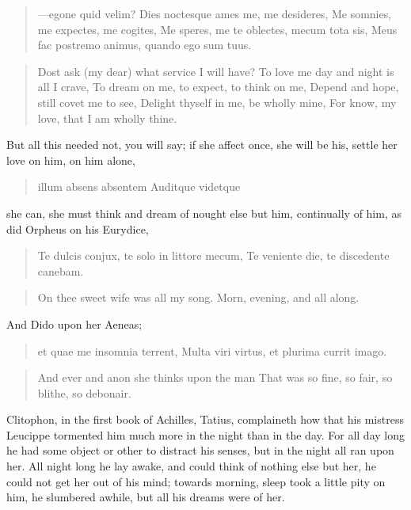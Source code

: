 \begin{latin}
\begin{verse}
---egone quid velim?
Dies noctesque ames me, me desideres,
Me somnies, me expectes, me cogites,
Me speres, me te oblectes, mecum tota sis,
Meus fac postremo animus, quando ego sum tuus.
\end{verse}
\end{latin}
\translationrule%
\begin{verse}%
Dost ask (my dear) what service I will have?
To love me day and night is all I crave,
To dream on me, to expect, to think on me,
Depend and hope, still covet me to see,
Delight thyself in me, be wholly mine,
For know, my love, that I am wholly thine.
\end{verse}%

But all this needed not, you will say; if she affect once, she will be
his, settle her love on him, on him alone,

\begin{latin}
\begin{verse}
illum absens absentem
Auditque videtque
\end{verse}
\end{latin}

she can, she must think and dream of nought else but him, continually
of him, as did Orpheus on his Eurydice,

\begin{latin}
\begin{verse}
Te dulcis conjux, te solo in littore mecum,
Te veniente die, te discedente canebam.
\end{verse}
\end{latin}
\translationrule%
\begin{verse}%
On thee sweet wife was all my song.
Morn, evening, and all along.
\end{verse}%

And Dido upon her Aeneas;

\begin{latin}
\begin{verse}
et quae me insomnia terrent,
Multa viri virtus, et plurima currit imago.
\end{verse}
\end{latin}
\translationrule%
\begin{verse}%
And ever and anon she thinks upon the man
That was so fine, so fair, so blithe, so debonair.
\end{verse}%

Clitophon, in the first book of Achilles, Tatius, complaineth how that
his mistress Leucippe tormented him much more in the night than in the
day. For all day long he had some object or other to distract his
senses, but in the night all ran upon her. All night long he lay 
awake, and could think of nothing else but her, he could not get her
out of his mind; towards morning, sleep took a little pity on him, he
slumbered awhile, but all his dreams were of her.


